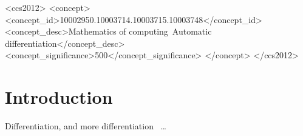 \documentclass[sigplan,10pt,review]{acmart}
\begin{document}
\begin{abstract}
Text of abstract \ldots.
\end{abstract}


\begin{CCSXML}
<ccs2012>
   <concept>
       <concept_id>10002950.10003714.10003715.10003748</concept_id>
       <concept_desc>Mathematics of computing~Automatic differentiation</concept_desc>
       <concept_significance>500</concept_significance>
       </concept>
 </ccs2012>
\end{CCSXML}





\maketitle


\section{Introduction}

Differentiation, and more differentiation~\cite{griewank2008evaluating} \ldots
\end{document}
